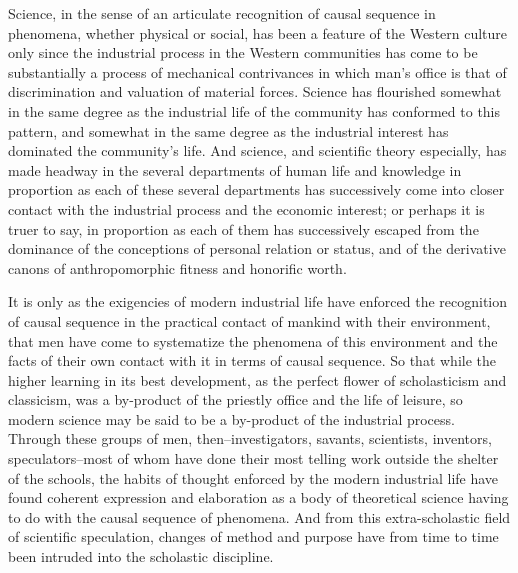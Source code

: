 \documentclass[12pt]{report}
\begin{document}
Science, in the sense of an articulate recognition of causal sequence in
phenomena, whether physical or social, has been a feature of the Western
culture only since the industrial process in the Western communities has
come to be substantially a process of mechanical contrivances in which
man's office is that of discrimination and valuation of material forces.
Science has flourished somewhat in the same degree as the industrial
life of the community has conformed to this pattern, and somewhat in
the same degree as the industrial interest has dominated the community's
life. And science, and scientific theory especially, has made headway
in the several departments of human life and knowledge in proportion
as each of these several departments has successively come into closer
contact with the industrial process and the economic interest;
or perhaps it is truer to say, in proportion as each of them has
successively escaped from the dominance of the conceptions of personal
relation or status, and of the derivative canons of anthropomorphic
fitness and honorific worth.

It is only as the exigencies of modern industrial life have enforced the
recognition of causal sequence in the practical contact of mankind with
their environment, that men have come to systematize the phenomena of
this environment and the facts of their own contact with it in terms
of causal sequence. So that while the higher learning in its best
development, as the perfect flower of scholasticism and classicism, was
a by-product of the priestly office and the life of leisure, so modern
science may be said to be a by-product of the industrial process.
Through these groups of men, then--investigators, savants, scientists,
inventors, speculators--most of whom have done their most telling work
outside the shelter of the schools, the habits of thought enforced
by the modern industrial life have found coherent expression and
elaboration as a body of theoretical science having to do with the
causal sequence of phenomena. And from this extra-scholastic field of
scientific speculation, changes of method and purpose have from time to
time been intruded into the scholastic discipline.
\end{document}
